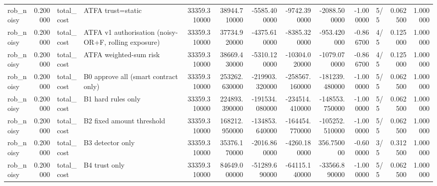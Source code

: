 \begin{tabular}{lrllrrrrrrlrr}
rob\_noisy & 0.200000 & total\_cost & ATFA trust=static & 33359.310000 & 38944.710000 & -5585.400000 & -9742.390000 & -2088.500000 & -1.000000 & 5/5 & 0.062500 & 1.000000 \\
rob\_noisy & 0.200000 & total\_cost & ATFA v1 authorisation (noisy-OR+F, rolling exposure) & 33359.310000 & 37734.920000 & -4375.610000 & -8385.320000 & -953.420000 & -0.866700 & 4/5 & 0.125000 & 1.000000 \\
rob\_noisy & 0.200000 & total\_cost & ATFA weighted-sum risk & 33359.310000 & 38669.430000 & -5310.120000 & -10304.020000 & -1079.070000 & -0.866700 & 4/5 & 0.125000 & 1.000000 \\
rob\_noisy & 0.200000 & total\_cost & B0 approve all (smart contract only) & 33359.310000 & 253262.630000 & -219903.320000 & -258567.160000 & -181239.480000 & -1.000000 & 5/5 & 0.062500 & 1.000000 \\
rob\_noisy & 0.200000 & total\_cost & B1 hard rules only & 33359.310000 & 224893.390000 & -191534.080000 & -234514.410000 & -148553.750000 & -1.000000 & 5/5 & 0.062500 & 1.000000 \\
rob\_noisy & 0.200000 & total\_cost & B2 fixed amount threshold & 33359.310000 & 168212.950000 & -134853.640000 & -164454.770000 & -105252.510000 & -1.000000 & 5/5 & 0.062500 & 1.000000 \\
rob\_noisy & 0.200000 & total\_cost & B3 detector only & 33359.310000 & 35376.170000 & -2016.860000 & -4260.180000 & 356.750000 & -0.600000 & 3/5 & 0.312500 & 1.000000 \\
rob\_noisy & 0.200000 & total\_cost & B4 trust only & 33359.310000 & 84649.000000 & -51289.690000 & -64115.140000 & -33566.890000 & -1.000000 & 5/5 & 0.062500 & 1.000000 \\
\bottomrule
\end{tabular}
